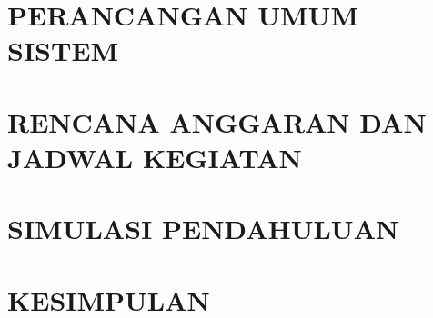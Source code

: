 \documentclass{data/DTETI_Capstone_C251}
\begin{document}
\chapter{\uppercase{Perancangan Umum Sistem}}
\label{chap:Perancangan_Umum_Sistem}


\chapter{\uppercase{Rencana Anggaran dan Jadwal Kegiatan}}
\label{chap:RAB_JadwalKegiatan}


\chapter{\uppercase{Simulasi Pendahuluan}}
\label{chap:Simulasi_Pendahuluan}


\chapter{\uppercase{Kesimpulan}}
\label{chap:Kesimpulan}


\begin{thebibliography}{}
    
\end{thebibliography}

\end{document}
